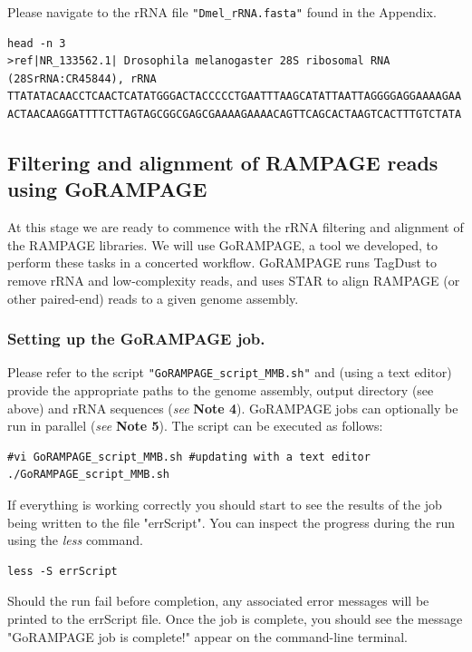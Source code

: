 \documentclass[runningheads,a4paper]{llncs}
\begin{document}
\begin{linenumbers}
\noindent
Please navigate to the rRNA file \texttt{"Dmel\_rRNA.fasta"} found in the Appendix.

\noindent
\begin{verbatim}
head -n 3
>ref|NR_133562.1| Drosophila melanogaster 28S ribosomal RNA (28SrRNA:CR45844), rRNA
TTATATACAACCTCAACTCATATGGGACTACCCCCTGAATTTAAGCATATTAATTAGGGGAGGAAAAGAA
ACTAACAAGGATTTTCTTAGTAGCGGCGAGCGAAAAGAAAACAGTTCAGCACTAAGTCACTTTGTCTATA
\end{verbatim}

\subsection{Filtering and alignment of RAMPAGE reads using GoRAMPAGE}
At this stage we are ready to commence with the rRNA filtering and alignment of the RAMPAGE libraries.
We will use GoRAMPAGE, a tool we developed, to perform these tasks in a concerted workflow. 
GoRAMPAGE runs TagDust \cite{Lassmann:2015gs} to remove rRNA and low-complexity reads, and uses STAR \cite{Dobin:2016kq} to align RAMPAGE (or other paired-end) reads to a given genome assembly.

\subsubsection{Setting up the GoRAMPAGE job.}
Please refer to the script \texttt{"GoRAMPAGE\_script\_MMB.sh"} and (using a text editor) provide the appropriate paths to the genome assembly, output directory (see above) and rRNA sequences (\textit{see} \textbf{Note 4}). 
GoRAMPAGE jobs can optionally be run in parallel (\textit{see} \textbf{Note 5}).
The script can be executed as follows:

\noindent
\begin{verbatim}
#vi GoRAMPAGE_script_MMB.sh #updating with a text editor
./GoRAMPAGE_script_MMB.sh
\end{verbatim}

\noindent
If everything is working correctly you should start to see the results of the job being written to the file "errScript".
You can inspect the progress during the run using the \textit{less} command. 

\noindent
\begin{verbatim}
less -S errScript
\end{verbatim}

\noindent
Should the run fail before completion, any associated error messages will be printed to the errScript file. Once the job is complete, you should see the message "GoRAMPAGE job is complete!" appear on the command-line terminal.


\end{linenumbers}
\end{document}
